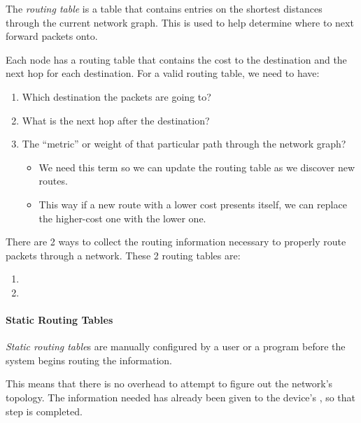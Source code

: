 \begin{definition}\label{def:Routing_Table}
  The \emph{routing table} is a table that contains entries on the shortest distances through the current network graph.
  This is used to help determine where to next forward packets onto.

  Each node has a routing table that contains the cost to the destination and the next hop for each destination.
  For a valid routing table, we need to have:
  \begin{enumerate}[noitemsep]
  \item Which destination the packets are going to?
  \item What is the next hop after the destination?
  \item The ``metric'' or weight of that particular path through the network graph?
    \begin{itemize}[noitemsep]
    \item We need this term so we can update the routing table as we discover new routes.
    \item This way if a new route with a lower cost presents itself, we can replace the higher-cost one with the lower one.
    \end{itemize}
  \end{enumerate}
\end{definition}

There are 2 ways to collect the routing information necessary to properly route packets through a network.
These 2 routing tables are:
\begin{enumerate}[noitemsep]
\item {}
\item {}
\end{enumerate}

\paragraph{Static Routing Tables}\label{par:Static_Routing_Tables}
\begin{definition}\label{def:Static_Routing_Table}
  \emph{Static routing table}s are manually configured by a user or a program before the system begins routing the information.
\end{definition}

This means that there is no overhead to attempt to figure out the network's topology.
The information needed has already been given to the device's , so that step is completed.


